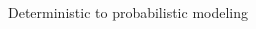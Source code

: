 \documentclass[10pt,aspectratio=169]{beamer}
\begin{document}
\begin{frame}[t]{Deterministic to probabilistic modeling}
{\begin{columns}[T]
    \begin{column}{0.5\textwidth}	

\end{column}
\end{columns}}
\end{frame}
\end{document}
